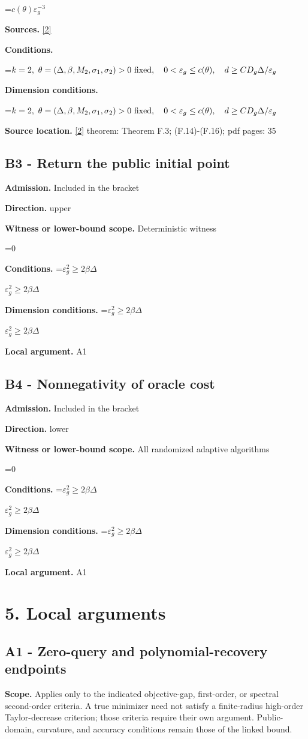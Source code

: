 \documentclass[10pt,a4paper]{article}
\newcommand{\AtlasMath}[1]{\par\begingroup\centering\setbox0=\hbox{$\displaystyle #1$}\ifdim\wd0>1.4\linewidth\typeout{ATLAS WIDE FORMULA: \the\wd0}\fi\ifdim\wd0>\linewidth\resizebox{\linewidth}{!}{\box0}\else\box0\fi\par\endgroup}
\newcommand{\AtlasInlineMath}[1]{\begingroup\setbox0=\hbox{$#1$}\ifdim\wd0>.4\linewidth\endgroup\AtlasMath{#1}\else\endgroup$#1$\fi}
\begin{document}
\AtlasMath{c(\theta)\varepsilon_g^{-3}}
\textbf{Sources.} \href{https://arxiv.org/pdf/2609.28238v2}{[2]}

\textbf{Conditions.} 
\AtlasMath{k=2,\ \theta=(\Delta,\beta,M_2,\sigma_1,\sigma_2)>0\ {\rm fixed},\quad0<\varepsilon_g\le c(\theta),\quad d\ge C D_g\Delta/\varepsilon_g}


\textbf{Dimension conditions.} 
\AtlasMath{k=2,\ \theta=(\Delta,\beta,M_2,\sigma_1,\sigma_2)>0\ {\rm fixed},\quad0<\varepsilon_g\le c(\theta),\quad d\ge C D_g\Delta/\varepsilon_g}


\textbf{Source location.} \href{https://arxiv.org/pdf/2609.28238v2}{[2]} theorem: Theorem F.3; (F.14)-(F.16); pdf pages: 35

\subsection{B3 - Return the public initial point}
\textbf{Admission.} Included in the bracket

\textbf{Direction.} upper

\textbf{Witness or lower-bound scope.} Deterministic witness

\AtlasMath{0}
\textbf{Conditions.} \AtlasInlineMath{\varepsilon_g^2\ge2\beta\Delta}

\textbf{Dimension conditions.} \AtlasInlineMath{\varepsilon_g^2\ge2\beta\Delta}

\textbf{Local argument.} A1

\subsection{B4 - Nonnegativity of oracle cost}
\textbf{Admission.} Included in the bracket

\textbf{Direction.} lower

\textbf{Witness or lower-bound scope.} All randomized adaptive algorithms

\AtlasMath{0}
\textbf{Conditions.} \AtlasInlineMath{\varepsilon_g^2\ge2\beta\Delta}

\textbf{Dimension conditions.} \AtlasInlineMath{\varepsilon_g^2\ge2\beta\Delta}

\textbf{Local argument.} A1

\section{5. Local arguments}
\subsection{A1 - Zero-query and polynomial-recovery endpoints}
\textbf{Scope.} Applies only to the indicated objective-gap, first-order, or spectral second-order criteria. A true minimizer need not satisfy a finite-radius high-order Taylor-decrease criterion; those criteria require their own argument. Public-domain, curvature, and accuracy conditions remain those of the linked bound.
\end{document}
